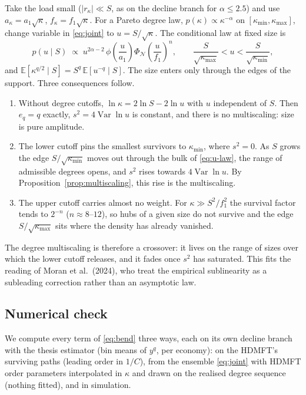 \documentclass[11pt]{article}
\newcommand{\E}{\mathbb E}
\newcommand{\Var}{\operatorname{Var}}
\theoremstyle{remark}
\begin{document}
Take the load small ($|r_\kappa|\ll S$, as on the decline branch for $\alpha\le2.5$) and use
$a_\kappa=a_1\sqrt\kappa$, $f_\kappa=f_1\sqrt\kappa$.  For a Pareto degree law,
$p(\kappa)\propto\kappa^{-\alpha}$ on $[\kappa_{\min},\kappa_{\max}]$, change variable in
\eqref{eq:joint} to $u=S/\sqrt\kappa$.  The conditional law at fixed size is
\begin{equation}
  p(u\mid S)\;\propto\;u^{2\alpha-2}\,\phi\!\left(\frac u{a_1}\right)
  \Phi_{\mathcal N}\!\left(\frac u{f_1}\right)^{n},
  \qquad
  \frac S{\sqrt{\kappa_{\max}}}<u<\frac S{\sqrt{\kappa_{\min}}},
  \label{eq:u-law}
\end{equation}
and $\E[\kappa^{q/2}\mid S]=S^q\,\E[u^{-q}\mid S]$.  The size enters only through the edges of
the support.  Three consequences follow.
\begin{enumerate}
  \item Without degree cutoffs, $\ln\kappa=2\ln S-2\ln u$ with $u$ independent of $S$.  Then
        $e_q=q$ exactly, $s^2=4\Var\ln u$ is constant, and there is no multiscaling: size is
        pure amplitude.
  \item The lower cutoff pins the smallest survivors to $\kappa_{\min}$, where $s^2=0$.  As $S$
        grows the edge $S/\sqrt{\kappa_{\min}}$ moves out through the bulk of \eqref{eq:u-law},
        the range of admissible degrees opens, and $s^2$ rises towards $4\Var\ln u$.  By
        Proposition~\ref{prop:multiscaling}, this rise is the multiscaling.
  \item The upper cutoff carries almost no weight.  For $\kappa\gg S^2/f_1^2$ the survival factor
        tends to $2^{-n}$ ($n\approx8$--$12$), so hubs of a given size do not survive and the
        edge $S/\sqrt{\kappa_{\max}}$ sits where the density has already vanished.
\end{enumerate}
The degree multiscaling is therefore a crossover: it lives on the range of sizes over which the
lower cutoff releases, and it fades once $s^2$ has saturated.  This fits the reading of
Moran et al.\ (2024), who treat the empirical sublinearity as a subleading correction rather than an
asymptotic law.

\subsection{Numerical check}

We compute every term of \eqref{eq:bend} three ways, each on its own decline branch with the
thesis estimator (bin means of $y^q$, per economy): on the HDMFT's surviving paths (leading order
in $1/C$), from the ensemble \eqref{eq:joint} with HDMFT order parameters interpolated in $\kappa$
and drawn on the realised degree sequence (nothing fitted), and in simulation.
\end{document}
